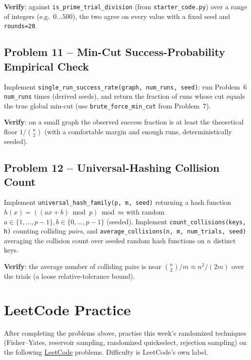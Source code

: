 \documentclass[11pt]{article}
\begin{document}
\textbf{Verify}: against \texttt{is\_prime\_trial\_division} (from \texttt{starter\_code.py})
over a range of integers (e.g.\ $0\ldots500$), the two agree on every value with a fixed
seed and \texttt{rounds=20}.

\subsection*{Problem 11 -- Min-Cut Success-Probability Empirical Check}

Implement \texttt{single\_run\_success\_rate(graph, num\_runs, seed)}: run Problem~6
\texttt{num\_runs} times (derived seeds), and return the fraction of runs whose cut equals
the true global min-cut (use \texttt{brute\_force\_min\_cut} from Problem~7).

\textbf{Verify}: on a small graph the observed success fraction is at least the theoretical
floor $1/\binom{n}{2}$ (with a comfortable margin and enough runs, deterministically
seeded).

\subsection*{Problem 12 -- Universal-Hashing Collision Count}

Implement \texttt{universal\_hash\_family(p, m, seed)} returning a hash function
$h(x) = ((a x + b)\bmod p)\bmod m$ with random $a\in\{1,\ldots,p-1\}, b\in\{0,\ldots,p-1\}$
(seeded). Implement \texttt{count\_collisions(keys, h)} counting colliding \emph{pairs}, and
\texttt{average\_collisions(n, m, num\_trials, seed)} averaging the collision count over
seeded random hash functions on $n$ distinct keys.

\textbf{Verify}: the average number of colliding pairs is near $\binom{n}{2}/m \approx
n^2/(2m)$ over the trials (a loose relative-tolerance bound).

\newpage
\section{LeetCode Practice}

After completing the problems above, practise this week's randomized techniques
(Fisher--Yates, reservoir sampling, randomized quickselect, rejection sampling) on the
following \href{https://leetcode.com}{LeetCode} problems. Difficulty is LeetCode's own
label.
\end{document}
